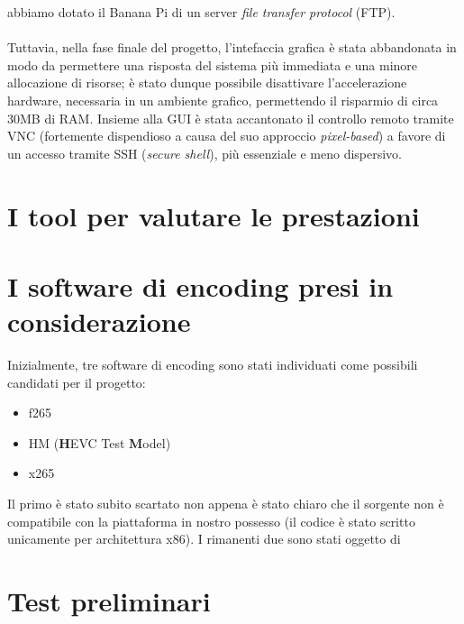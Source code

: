 abbiamo dotato il Banana Pi di un server \emph{file transfer protocol} (FTP).
\\ \\ 
Tuttavia, nella fase finale del progetto, l'intefaccia grafica è stata 
abbandonata in modo da permettere una risposta del sistema più immediata e una 
minore allocazione di risorse; è stato dunque possibile disattivare 
l'accelerazione hardware, necessaria in un ambiente grafico, permettendo il 
risparmio di circa 30MB di RAM. Insieme alla GUI è stata accantonato il 
controllo remoto tramite VNC (fortemente dispendioso a causa del suo approccio 
\emph{pixel-based}) a favore di un accesso tramite SSH (\emph{secure shell}), 
più essenziale e meno dispersivo.


\section{I tool per valutare le prestazioni}


\section{I software di encoding presi in considerazione}
Inizialmente, tre software di encoding sono stati individuati come possibili
candidati per il progetto:
\begin{itemize}
\item f265
\item HM (\textbf{H}EVC Test \textbf{M}odel)
\item x265
\end{itemize}
Il primo è stato subito scartato non appena è stato chiaro che il sorgente non 
è compatibile con la piattaforma in nostro possesso (il codice è stato scritto 
unicamente per architettura x86).
I rimanenti due sono stati oggetto di 

\section{Test preliminari}

